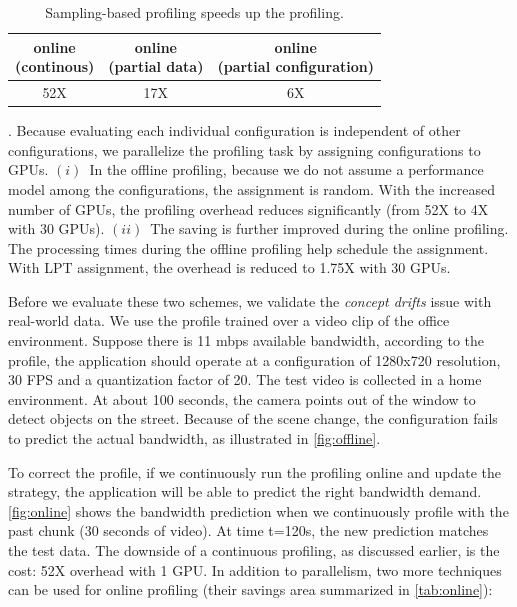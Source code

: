 
\begin{table}[t]
  \centering
  \begin{tabular}{c c c}
    \toprule
    \specialcell{online\\ (continous)} &  \specialcell{online\\ (partial data)} & \specialcell{online\\ (partial configuration)} \\
    \midrule
    52X   & 17X              & 6X \\
    \bottomrule
  \end{tabular}
  \caption{Sampling-based profiling speeds up the profiling.}
  \label{tab:online}
\end{table}

. Because
evaluating each individual configuration is independent of other configurations,
we parallelize the profiling task by assigning configurations to GPUs. $(i)$~In
the offline profiling, because we do not assume a performance model among the
configurations, the assignment is random. With the increased number of GPUs, the
profiling overhead reduces significantly (from 52X to 4X with 30
GPUs). $(ii)$~The saving is further improved during the online profiling. The
processing times during the offline profiling help schedule the assignment. With
LPT assignment, the overhead is reduced to 1.75X with 30 GPUs.

 Before we evaluate these two schemes, we validate the
\textit{concept drifts} issue with real-world data. We use the profile trained
over a video clip of the office environment. Suppose there is 11 mbps available
bandwidth, according to the profile, the application should operate at a
configuration of 1280x720 resolution, 30 FPS and a quantization factor of
20. The test video is collected in a home environment. At about 100 seconds, the
camera points out of the window to detect objects on the street.  Because of the
scene change, the configuration fails to predict the actual bandwidth, as
illustrated in \autoref{fig:offline}.

To correct the profile, if we continuously run the profiling online and update
the strategy, the application will be able to predict the right bandwidth
demand. \autoref{fig:online} shows the bandwidth prediction when we continuously
profile with the past chunk (30 seconds of video). At time t=120s, the new
prediction matches the test data. The downside of a continuous profiling, as
discussed earlier, is the cost: 52X overhead with 1 GPU. In addition to
parallelism, two more techniques can be used for online profiling (their savings
area summarized in \autoref{tab:online}):

